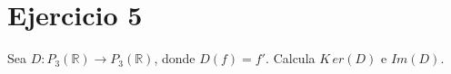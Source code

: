 \section*{Ejercicio 5}

Sea $D : P_{3}(\mathbb{R}) \rightarrow P_{3}(\mathbb{R})$, donde $D(f) = f'$. Calcula $K\,er(D)$ e $Im(D)$.